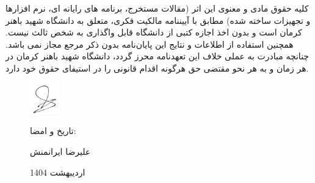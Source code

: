 {کلیه حقوق مادی و معنوی این اثر (مقالات مستخرج، برنامه های رایانه ای، نرم افزارها و تجهیزات ساخته شده) مطابق با آیین\/نامه مالکیت فکری، متعلق به دانشگاه شهید باهنر کرمان است و بدون اخذ اجازه کتبی از دانشگاه قابل واگذاری به شخص ثالث نیست. همچنین استفاده از اطلاعات و نتایج این پایان‌نامه بدون ذکر مرجع مجاز نمی باشد. چنانچه مبادرت به عملی خلاف این تعهدنامه محرز گردد، دانشگاه شهید باهنر کرمان در هر زمان و به هر نحو مقتضی حق هرگونه اقدام قانونی را در استیفای حقوق خود دارد.
\begin{figure}[!ht]
	\vspace{-5mm}
	\includegraphics[width=13mm]{images/sign2}
	\vspace{-2mm}
	\parbox[l]{.6\linewidth}{تاریخ و امضا:
		
		علیرضا ایرانمنش
		
		اردیبهشت 1404}
\end{figure}

}